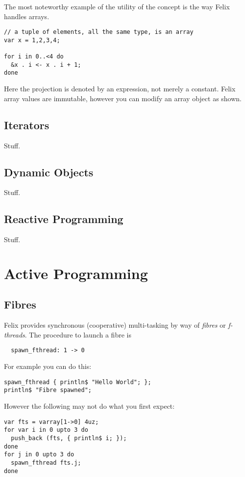 \documentclass[oneside]{book}
\begin{document}
The most noteworthy example of the utility of the concept is the
way Felix handles arrays.

\begin{verbatim}
// a tuple of elements, all the same type, is an array
var x = 1,2,3,4; 

for i in 0..<4 do
  &x . i <- x . i + 1;
done
\end{verbatim}

Here the projection is denoted by an expression, not merely
a constant. Felix array values are immutable, however you can
modify an array object as shown.
\chapter{Iterators}
Stuff.
\chapter{Dynamic Objects}
Stuff.
\chapter{Reactive Programming}
Stuff.

\part{Active Programming}
\chapter{Fibres}
Felix provides synchronous (cooperative) multi-tasking by way of {\em fibres}
or {\em f-threads}. The procedure to launch a fibre is 

\begin{verbatim}
  spawn_fthread: 1 -> 0
\end{verbatim}

For example you can do this:

\begin{verbatim}
spawn_fthread { println$ "Hello World"; };
println$ "Fibre spawned";
\end{verbatim}

However the following may not do what you first expect:

\begin{verbatim}
var fts = varray[1->0] 4uz;
for var i in 0 upto 3 do
  push_back (fts, { println$ i; });
done
for j in 0 upto 3 do
  spawn_fthread fts.j;
done
\end{verbatim}
\end{document}
